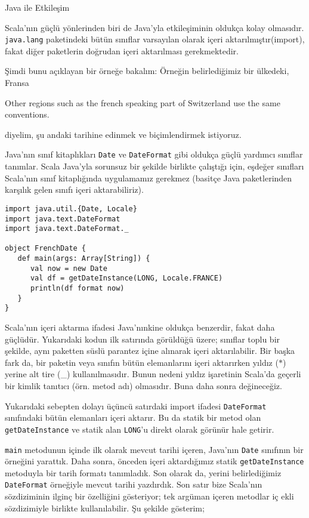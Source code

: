 \documentclass[10pt,a4paper]{book}
\begin{document}
\begin{chapter}{Java ile Etkileşim}

Scala'nın güçlü yönlerinden biri de Java'yla etkileşiminin oldukça kolay olmasıdır. \texttt{java.lang} paketindeki bütün sınıflar varsayılan olarak içeri aktarılmıştır(import), fakat diğer paketlerin doğrudan içeri aktarılması gerekmektedir.

Şimdi bunu açıklayan bir örneğe bakalım: Örneğin belirlediğimiz bir ülkedeki, Fransa\begin{footnote}{Other regions such as the french speaking part of Switzerland use the same conventions.}\end{footnote} diyelim, şu andaki tarihine edinmek ve biçimlendirmek istiyoruz.

Java'nın sınıf kitaplıkları \texttt{Date} ve \texttt{DateFormat} gibi oldukça güçlü yardımcı sınıflar tanımlar. Scala Java'yla sorunsuz bir şekilde birlikte çalıştığı için, eşdeğer sınıfları Scala'nın sınıf kitaplığında uygulamamız gerekmez (basitçe Java paketlerinden karşılık gelen sınıfı içeri aktarabiliriz).

\begin{verbatim}
import java.util.{Date, Locale}
import java.text.DateFormat
import java.text.DateFormat._

object FrenchDate {
   def main(args: Array[String]) {
      val now = new Date
      val df = getDateInstance(LONG, Locale.FRANCE)
      println(df format now)
   }
}
\end{verbatim}

Scala'nın içeri aktarma ifadesi Java'nınkine oldukça benzerdir, fakat daha güçlüdür. Yukarıdaki kodun ilk satırında görüldüğü üzere; sınıflar toplu bir şekilde, aynı paketten süslü parantez içine alınarak içeri aktarılabilir. Bir başka fark da, bir paketin veya sınıfın bütün elemanlarını içeri aktarırken yıldız ($*$) yerine alt tire (\_) kullanılmasıdır. Bunun nedeni yıldız işaretinin Scala'da geçerli bir kimlik tanıtıcı (örn. metod adı) olmasıdır. Buna daha sonra değineceğiz.

Yukarıdaki sebepten dolayı üçüncü satırdaki import ifadesi \texttt{DateFormat} sınıfındaki bütün elemanları içeri aktarır. Bu da statik bir metod olan \texttt{getDateInstance} ve statik alan \texttt{LONG}'u direkt olarak görünür hale getirir.

\texttt{main} metodunun içinde ilk olarak mevcut tarihi içeren, Java'nın \texttt{Date} sınıfının bir örneğini yarattık. Daha sonra, önceden içeri aktardığımız statik \texttt{getDateInstance} metoduyla bir tarih formatı tanımladık. Son olarak da, yerini belirlediğimiz \texttt{DateFormat} örneğiyle mevcut tarihi yazdırdık. Son satır bize Scala'nın sözdiziminin ilginç bir özelliğini gösteriyor; tek argüman içeren metodlar iç ekli sözdizimiyle birlikte kullanılabilir. Şu şekilde gösterim;


\end{chapter}
\end{document}
